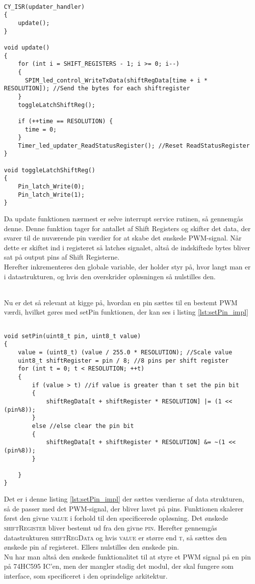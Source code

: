 \documentclass[Softwaredesign/Softwaredesign_main.tex]{subfiles}
\begin{document}
\begin{lstlisting}[caption={ISR & Update}, label={lst:ISR_Update_impl}]

CY_ISR(updater_handler)
{
    update();
}                   

void update()
{
    for (int i = SHIFT_REGISTERS - 1; i >= 0; i--)
    {
      SPIM_led_control_WriteTxData(shiftRegData[time + i * RESOLUTION]); //Send the bytes for each shiftregister
    }
    toggleLatchShiftReg();
    
    if (++time == RESOLUTION) {
      time = 0;
    }
    Timer_led_updater_ReadStatusRegister(); //Reset ReadStatusRegister
}

void toggleLatchShiftReg()
{
    Pin_latch_Write(0);
    Pin_latch_Write(1);
}
\end{lstlisting}

Da update funktionen nærmest er selve interrupt service rutinen, så gennemgås denne. Denne funktion tager for antallet af Shift Registers og skifter det data, der svarer til de nuværende pin værdier for at skabe det ønskede PWM-signal. Når dette er skiftet ind i registeret så latches signalet, altså de indskiftede bytes bliver sat på output pins af Shift Registerne.\\
Herefter inkrementeres den globale variable, der holder styr på, hvor langt man er i datastrukturen, og hvis den overskrider opløsningen så nulstilles den.

\\Nu er det så relevant at kigge på, hvordan en pin sættes til en bestemt PWM værdi, hvilket gøres med setPin funktionen, der kan ses i listing \ref{lst:setPin_impl}

\begin{lstlisting}[caption={Implementeringen af setPin}, label={lst:setPin_impl}]

void setPin(uint8_t pin, uint8_t value)
{
    value = (uint8_t) (value / 255.0 * RESOLUTION); //Scale value
    uint8_t shiftRegister = pin / 8; //8 pins per shift register
    for (int t = 0; t < RESOLUTION; ++t)
    {
        if (value > t) //if value is greater than t set the pin bit
        {
            shiftRegData[t + shiftRegister * RESOLUTION] |= (1 << (pin%8));
        }
        else //else clear the pin bit
        {
            shiftRegData[t + shiftRegister * RESOLUTION] &= ~(1 << (pin%8));
        }
        
    }
}
\end{lstlisting}

Det er i denne listing \ref{lst:setPin_impl} der sættes værdierne af data strukturen, så de passer med det PWM-signal, der bliver lavet på pins. Funktionen skalerer først den givne \textsc{value} i forhold til den specificerede opløsning. Det ønskede \textsc{shiftRegister} bliver bestemt ud fra den givne \textsc{pin}. Herefter gennemgås datastrukturen \textsc{shiftRegData} og hvis \textsc{value} er større end \textsc{t}, så sættes den ønskede pin af registeret. Ellers nulstilles den ønskede pin.
\\Nu har man altså den ønskede funktionalitet til at styre et PWM signal på en pin på 74HC595 IC'en, men der mangler stadig det modul, der skal fungere som interface, som specificeret i den oprindelige arkitektur.
\end{document}
